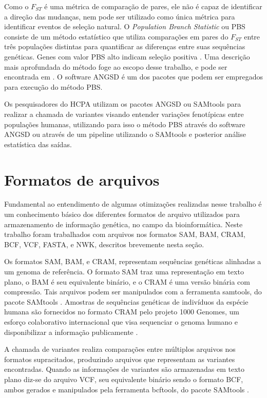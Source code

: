 \documentclass[cic,tc]{iiufrgs}
\begin{document}
Como o $F_{ST}$ é uma métrica de comparação de pares, ele não é capaz de
identificar a direção das mudanças, nem pode ser utilizado como única métrica
para identificar eventos de seleção natural. O \textit{Population Branch
Statistic} ou PBS consiste de um método estatístico que utiliza comparações em
pares do $F_{ST}$ entre três populações distintas para quantificar as
diferenças entre suas sequências genéticas. Genes com valor PBS alto indicam
seleção positiva \cite{jiang2019population}. Uma descrição mais aprofundada do
método foge ao escopo desse trabalho, e pode ser encontrada em
\cite{yi2010sequencing}. O software ANGSD é um dos pacotes que podem ser
empregados para execução do método PBS.

Os pesquisadores do HCPA utilizam os pacotes ANGSD ou SAMtools para realizar a
chamada de variantes visando entender variações fenotípicas entre populações
humanas, utilizando para isso o método PBS através do software ANGSD ou através
de um pipeline utilizando o SAMtools e posterior análise estatística das
saídas.

\section{Formatos de arquivos}
\label{sec:formats}


Fundamental ao entendimento de algumas otimizações realizadas nesse trabalho é
um conhecimento básico dos diferentes formatos de arquivo utilizados para
armazenamento de informação genética, no campo da bioinformática. Neste
trabalho foram trabalhados com arquivos nos formatos SAM, BAM, CRAM, BCF, VCF,
FASTA, e NWK, descritos brevemente nesta seção.

Os formatos SAM, BAM, e CRAM, representam sequências genéticas alinhadas a um
genoma de referência. O formato SAM traz uma representação em texto plano, o
BAM é seu equivalente binário, e o CRAM é uma versão binária com compressão.
Tais arquivos podem ser manipulados com a ferramenta samtools, do pacote
SAMtools \cite{danecek2021twelve}. Amostras de sequências genéticas de
indivíduos da espécie humana são fornecidos no formato CRAM pelo projeto 1000
Genomes, um esforço colaborativo internacional que visa sequenciar o genoma
humano e disponibilizar a informação publicamente \cite{via20101000}.

A chamada de variantes realiza comparações entre múltiplos arquivos nos
formatos supracitados, produzindo arquivos que representam as variantes
encontradas. Quando as informações de variantes são armazenadas em texto plano
diz-se do arquivo VCF, seu equivalente binário sendo o formato BCF, ambos
gerados e manipulados pela ferramenta bcftools, do pacote
SAMtools \cite{danecek2021twelve}.
\end{document}
